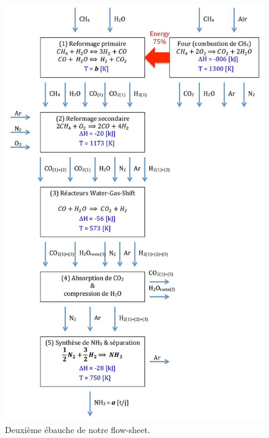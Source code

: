 \begin{figure}[htb!]
	\centering
	\includegraphics[scale=0.65]{media/flow-sheet-v2.jpg}
	\caption{Deuxième ébauche de notre flow-sheet.}
	\label{flow-sheet-v2}
\end{figure}
\newpage

%
%
%

